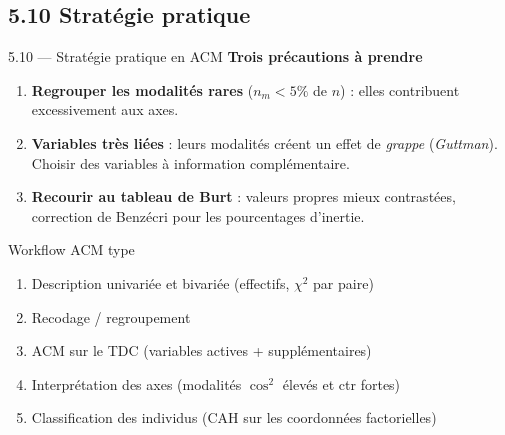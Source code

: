 \subsection{5.10 Stratégie pratique}
\begin{frame}{5.10 — Stratégie pratique en ACM}
\textbf{Trois précautions à prendre}
\begin{enumerate}
  \item \textbf{Regrouper les modalités rares} ($n_m < 5\%$ de $n$) :
        elles contribuent excessivement aux axes.
  \item \textbf{Variables très liées} : leurs modalités créent un effet de
        \emph{grappe} (\textit{Guttman}). Choisir des variables à information
        complémentaire.
  \item \textbf{Recourir au tableau de Burt} : valeurs propres mieux contrastées,
        correction de Benzécri pour les pourcentages d'inertie.
\end{enumerate}

\vspace{0.2cm}
\begin{block}{Workflow ACM type}
\begin{enumerate}\small
  \item Description univariée et bivariée (effectifs, $\chi^2$ par paire)
  \item Recodage / regroupement
  \item ACM sur le TDC (variables actives + supplémentaires)
  \item Interprétation des axes (modalités $\cos^2$ élevés et ctr fortes)
  \item Classification des individus (CAH sur les coordonnées factorielles)
\end{enumerate}
\end{block}
\end{frame}

